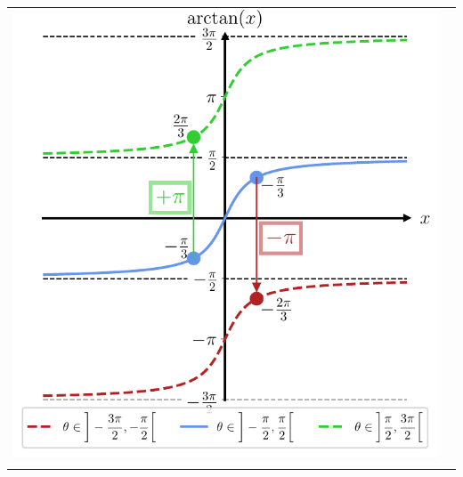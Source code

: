 \documentclass[../../main/main.tex]{subfiles}
\begin{document}
\begin{tcb*}[breakable]
\begin{center}
\begin{tabularx}{\linewidth}{YY}
{					{\includegraphics[width=0.85\linewidth]{fig_atan_prof}}
				}%
				\\
\end{tabularx}
\end{center}
\end{tcb*}
\end{document}
